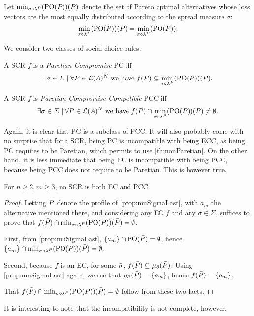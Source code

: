 \documentclass[version=3.21, pagesize, twoside=off, bibliography=totoc, DIV=calc, fontsize=12pt, a4paper]{scrartcl}
\begin{document}
Let $\mustar(P)$ denote the set of Pareto optimal alternatives whose loss vectors are the most equally distributed according to the spread measure $\sigma$:
\[\mustar(P) = \min_{\sigma \circ \lambda^P} (\paretopt(P)).\]

We consider two classes of social choice rules.

\begin{definition} A SCR $f$ is a \emph{Paretian Compromise} PC iff \[\exists \sigma \in \Sigma \suchthat \forall P \in \linors^N \text{ we have } f(P) \subseteq \mustar(P).\]
\end{definition}

\begin{definition} A SCR $f$ is \emph{Paretian Compromise Compatible} PCC iff \[\exists \sigma \in \Sigma \suchthat \forall P \in \linors^N \text{ we have } f(P) \cap \mustar(P) \neq \emptyset.\]
\end{definition}

Again, it is clear that PC is a subclass of PCC. It will also probably come with no surprise that for a SCR, being PC is incompatible with being ECC, as being PC requires to be Paretian, which permits to use \cref{th:nonParetian}. On the other hand, it is less immediate that being EC is incompatible with
being PCC, because being PCC does not require to be Paretian. This is however true.

\begin{theorem} \label{th:incompatibility} 
	For $n ≥ 2, m ≥ 3$, no SCR is both EC and PCC.
\end{theorem}
\begin{proof}	
	Letting $\bar{P}$ denote the profile of \cref{prop:muSigmaLast}, with $a_m$ the alternative mentioned there, and considering any EC $f$ and any $\sigma \in \Sigma$, suffices to prove that $f(\Ptop) \cap \mustar(\Ptop) = \emptyset$.
	
	First, from \cref{prop:muSigmaLast}, $\{a_m\} \cap \text{PO}(\bar{P}) = \emptyset$, hence $\set{a_m} \cap \mustar(\Ptop) = \emptyset$.
	
	Second, because $f$ is an EC, for some $\bar{\sigma}$, $f(\bar{P}) \subseteq \mu_{\bar{\sigma}}(\bar{P})$. Using \cref{prop:muSigmaLast} again, we see that $\mu_{\bar{\sigma}}(\bar{P}) = \{a_m\}$, hence $f(\bar{P}) = \{a_m\}$.
	
	That $f(\Ptop) \cap \mustar(\Ptop) = \emptyset$ follow from these two facts.
\end{proof}

It is interesting to note that the incompatibility is not complete, however.
\end{document}
